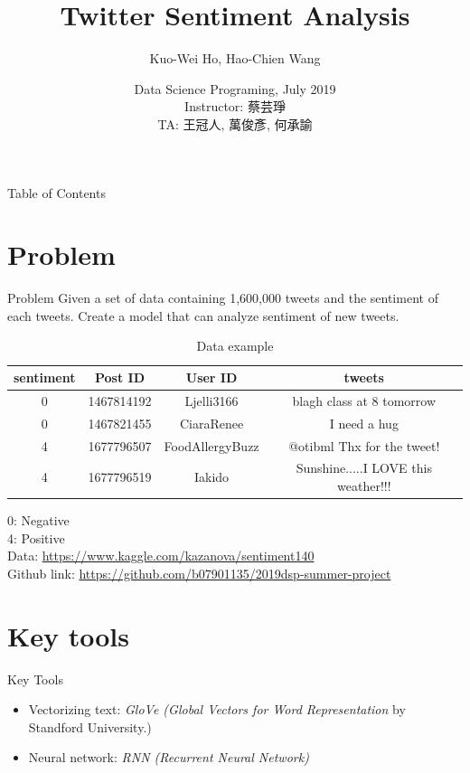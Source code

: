 \documentclass{beamer}
\title{Twitter Sentiment Analysis}
\author{Kuo-Wei Ho\inst{1}, Hao-Chien Wang\inst{2}}
\institute[NTU]
{
	\inst{1}
	NTUEE
	\and
	\inst{2}
	NTUPhys
}
\date[DSP 2019]
{Data Science Programing, July 2019\\{\scriptsize Instructor: 蔡芸琤}\\{\scriptsize TA: 王冠人, 萬俊彥, 何承諭}}
\begin{document}
\frame{\titlepage}

\begin{frame}{Table of Contents}
	\tableofcontents
\end{frame}

\section{Problem}%
\label{sec:problem}

\begin{frame}{Problem}
	Given a set of data containing 1,600,000 tweets and the sentiment of each tweets. Create a model that can analyze sentiment of new tweets.\\
	\begin{table}[htpb]
		\tiny
		\centering
		\caption{Data example}
		\label{tab:data}
		\begin{tabular}{c c c c}
			sentiment & Post ID & User ID & tweets \\
			\hline
			 0 & 1467814192 & Ljelli3166 & blagh class at 8 tomorrow  \\
			 0 & 1467821455 & CiaraRenee & I need a hug  \\
			 4 & 1677796507 & FoodAllergyBuzz & @otibml Thx for the tweet!  \\
			 4 & 1677796519 & Iakido & Sunshine.....I LOVE this weather!!!  \\
		\end{tabular}
	\end{table}
	0: Negative \\
	4: Positive \\
	{\scriptsize Data: \url{https://www.kaggle.com/kazanova/sentiment140}} \\
	{\scriptsize Github link: \url{https://github.com/b07901135/2019dsp-summer-project}}
\end{frame}


\section{Key tools}%
\label{sec:key_tools}


\begin{frame}{Key Tools}
	\begin{itemize}
		\item Vectorizing text: \textit{GloVe (Global Vectors for Word Representation} by Standford University.)
		\item Neural network: \textit{RNN (Recurrent Neural Network)}
	\end{itemize}
\end{frame}
\end{document}
